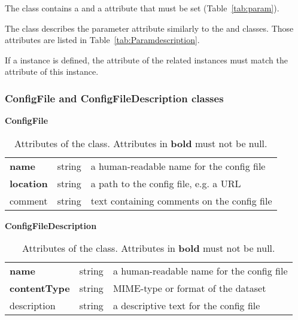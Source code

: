 The  class contains a  and a  attribute that must be set (Table~\ref{tab:param}).

The  class describes the parameter  attribute similarly to the  and  classes. Those attributes are listed in Table~\ref{tab:Paramdescription}.

If a  instance is defined, the  attribute of the related  instances must match the  attribute of this  instance.


\subsubsection{ConfigFile and ConfigFileDescription classes}

\begin{table}[ht]
\small
{}\textwidth
 \textbf{\normalsize ConfigFile}\vspace{0.25em}\\
 \begin{tabulary}{1.0\textwidth}{llL}
 \toprule
  &    & \\
 \midrule
\textbf{name} &  string & a human-readable name for the config file \\
\textbf{location} & string  &  a path to the config file, e.g. a URL \\
comment & string  & text containing comments on the config file  \\
\bottomrule
\end{tabulary}
\caption[Attributes of the  class]{Attributes of the  class. Attributes in \textbf{bold} must not be null.}
\label{tab:configfile}
\end{table}

\begin{table}[ht]
\small
{}\textwidth
\textbf{\normalsize ConfigFileDescription}\vspace{0.25em}\\
\begin{tabulary}{1.0\textwidth}{llL}
 \toprule
  &    & \\
 \midrule
\textbf{name}    & string & a human-readable name for the config file \\
\textbf{contentType}  & string  & MIME-type or format of the dataset \\
description     & string  & a descriptive text for the config file \\
\bottomrule
\end{tabulary}
\caption[Attributes of the  class]{Attributes of the   class. Attributes in \textbf{bold} must not be null.}
\label{tab:configfiledescription}
\end{table}

